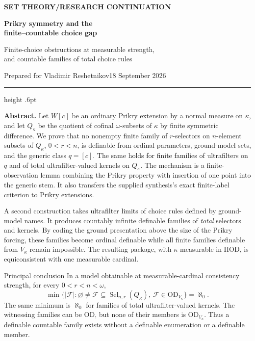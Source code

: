\documentclass[11pt,letterpaper]{article}
\theoremstyle{definition}
\numberwithin{equation}{section}
\newcommand{\HOD}{\mathrm{HOD}}
\newcommand{\OD}{\mathrm{OD}}
\newcommand{\FF}{\mathcal F}
\newcommand{\Sel}{\operatorname{Sel}}
\begin{document}
\thispagestyle{empty}
{\sffamily\bfseries\small\color{Olive}SET THEORY\quad /\quad RESEARCH CONTINUATION}
\vspace{13pt}

{\fontsize{28}{31}\selectfont\bfseries\color{Forest}Prikry symmetry and the\\ finite--countable choice gap\par}
\vspace{10pt}
{\fontsize{14}{18}\selectfont Finite-choice obstructions at measurable strength,\\ and countable families of total choice rules\par}
\vspace{14pt}
{\color{Muted}Prepared for Vladimir Reshetnikov\hfill 18 September 2026\par}
\vspace{3pt}
{\color{Sage}\hrule height .6pt}
\vspace{12pt}

\textbf{Abstract.} Let $W[c]$ be an ordinary Prikry extension by a normal measure on $\kappa$, and let $Q_\kappa$ be the quotient of cofinal $\omega$-subsets of $\kappa$ by finite symmetric difference. We prove that no nonempty finite family of $r$-selectors on $n$-element subsets of $Q_\kappa$, $0<r<n$, is definable from ordinal parameters, ground-model sets, and the generic class $q=[c]$. The same holds for finite families of ultrafilters on $q$ and of total ultrafilter-valued kernels on $Q_\kappa$. The mechanism is a finite-observation lemma combining the Prikry property with insertion of one point into the generic stem. It also transfers the supplied synthesis's exact finite-label criterion to Prikry extensions.

A second construction takes ultrafilter limits of choice rules defined by ground-model names. It produces countably infinite definable families of \emph{total} selectors and kernels. By coding the ground presentation above the size of the Prikry forcing, these families become ordinal definable while all finite families definable from $V_\kappa$ remain impossible. The resulting package, with $\kappa$ measurable in $\HOD$, is equiconsistent with one measurable cardinal.

\begin{assessment}{Principal conclusion}
In a model obtainable at measurable-cardinal consistency strength, for every $0<r<n<\omega$,
\[
\min\bigl\{|\FF|: \varnothing\ne\FF\subseteq\Sel_{n,r}(Q_\kappa),\
                    \FF\in\OD_{V_\kappa}\bigr\}=\aleph_0.
\]
The same minimum is $\aleph_0$ for families of total ultrafilter-valued kernels. The witnessing families can be $\OD$, but none of their members is $\OD_{V_\kappa}$. Thus a definable countable family exists without a definable enumeration or a definable member.
\end{assessment}
\end{document}
